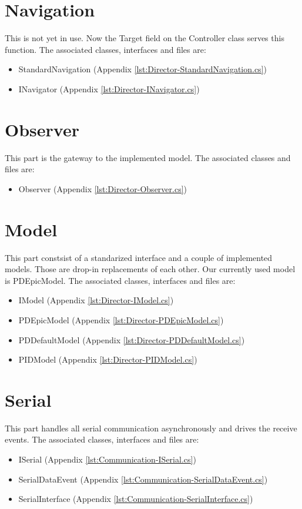\documentclass[final]{scrreprt} %
\begin{document}
\section{Navigation}
This is not yet in use. Now the Target field on the Controller class serves this function.
The associated classes, interfaces and files are:
\begin{itemize}
\item StandardNavigation (Appendix \ref{lst:Director-StandardNavigation.cs})
\item INavigator (Appendix \ref{lst:Director-INavigator.cs})
\end{itemize}
\section{Observer}
This part is the gateway to the implemented model.
The associated classes and files are:
\begin{itemize}
\item Observer (Appendix \ref{lst:Director-Observer.cs})
\end{itemize}
\section{Model}
This part constsist of a standarized interface and a couple of implemented models.
Those are drop-in replacements of each other.
Our currently used model is PDEpicModel.
The associated classes, interfaces and files are:
\begin{itemize}
\item IModel (Appendix \ref{lst:Director-IModel.cs})
\item PDEpicModel (Appendix \ref{lst:Director-PDEpicModel.cs})
\item PDDefaultModel (Appendix \ref{lst:Director-PDDefaultModel.cs})
\item PIDModel (Appendix \ref{lst:Director-PIDModel.cs})
\end{itemize}
\section{Serial}
This part handles all serial communication asynchronously and drives the receive events.
The associated classes, interfaces and files are:
\begin{itemize}
\item ISerial (Appendix \ref{lst:Communication-ISerial.cs})
\item SerialDataEvent (Appendix \ref{lst:Communication-SerialDataEvent.cs})
\item SerialInterface (Appendix \ref{lst:Communication-SerialInterface.cs})
\end{itemize}
\end{document}
